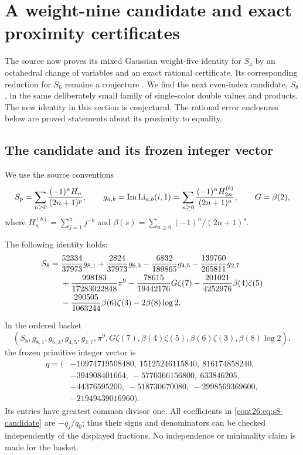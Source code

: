 \section{A weight-nine candidate and exact proximity certificates}
\label{cont26:sec:s8}

The source now proves its mixed Gaussian weight-five identity for $S_4$
by an octahedral change of variables and an exact rational certificate.
Its corresponding reduction for $S_6$ remains a conjecture
\cite{ProveIt}. We find the next even-index candidate, $S_8$, in the
same deliberately small family of single-color double values and products.
The new identity in this section is conjectural. The rational error
enclosures below are proved statements about its proximity to equality.

\subsection{The candidate and its frozen integer vector}
We use the source conventions
\[
 S_p=\sum_{n\geq0}\frac{(-1)^nH_n}{(2n+1)^p},\qquad
 g_{a,b}=\operatorname{Im}\operatorname{Li}_{a,b}(i,1)
 =\sum_{n\geq0}\frac{(-1)^nH_{2n}^{(b)}}{(2n+1)^a},
 \qquad G=\beta(2),
\]
where $H_n^{(b)}=\sum_{j=1}^n j^{-b}$ and
$\beta(s)=\sum_{n\geq0}(-1)^n/(2n+1)^s$.

\begin{conjecture}
\label{cont26:conj:s8}
The following identity holds:
\begin{align}
 S_8={}&\frac{52334}{37973}g_{8,1}
       +\frac{2824}{37973}g_{6,3}
       -\frac{6832}{189865}g_{4,5}
       -\frac{139760}{265811}g_{2,7}\notag\\
      &+\frac{998183}{17283022848}\pi^9
       -\frac{78615}{19442176}G\zeta(7)
       -\frac{201021}{4252976}\beta(4)\zeta(5)\notag\\
      &-\frac{290505}{1063244}\beta(6)\zeta(3)
       -2\beta(8)\log2.
 \label{cont26:eq:s8-candidate}
\end{align}
\end{conjecture}

In the ordered basket
\begin{equation}\label{cont26:eq:s8-basket}
 (S_8,g_{8,1},g_{6,3},g_{4,5},g_{2,7},\pi^9,
       G\zeta(7),\beta(4)\zeta(5),\beta(6)\zeta(3),\beta(8)\log2),
\end{equation}
the frozen primitive integer vector is
\begin{equation}\label{cont26:eq:s8-vector}
\begin{split}
q=(&-10974719508480,\ 15125246115840,\ 816174858240,\\
   &-394908401664,\ -5770366156800,\ 633846205,\\
   &-44376595200,\ -518730670080,\ -2998569369600,\\
   &-21949439016960).
\end{split}
\end{equation}
Its entries have greatest common divisor one. All coefficients in
\eqref{cont26:eq:s8-candidate} are $-q_j/q_0$; thus their signs and
denominators can be checked independently of the displayed fractions.
No independence or minimality claim is made for the basket.


